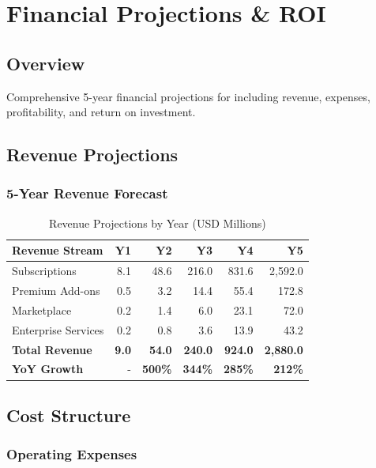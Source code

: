 \chapter{Financial Projections \& ROI}
\label{ch:financial-projections}

\section{Overview}
Comprehensive 5-year financial projections for \lifeos{} including revenue, expenses, profitability, and return on investment.

\section{Revenue Projections}

\subsection{5-Year Revenue Forecast}

\begin{table}[H]
\centering
\caption{Revenue Projections by Year (USD Millions)}
\begin{tabular}{|l|r|r|r|r|r|}
\hline
\rowcolor{lightgray}
\textbf{Revenue Stream} & \textbf{Y1} & \textbf{Y2} & \textbf{Y3} & \textbf{Y4} & \textbf{Y5} \\
\hline
Subscriptions & 8.1 & 48.6 & 216.0 & 831.6 & 2,592.0 \\
\hline
Premium Add-ons & 0.5 & 3.2 & 14.4 & 55.4 & 172.8 \\
\hline
Marketplace & 0.2 & 1.4 & 6.0 & 23.1 & 72.0 \\
\hline
Enterprise Services & 0.2 & 0.8 & 3.6 & 13.9 & 43.2 \\
\hline
\textbf{Total Revenue} & \textbf{9.0} & \textbf{54.0} & \textbf{240.0} & \textbf{924.0} & \textbf{2,880.0} \\
\hline
\textbf{YoY Growth} & - & \textbf{500\%} & \textbf{344\%} & \textbf{285\%} & \textbf{212\%} \\
\hline
\end{tabular}
\end{table}

\section{Cost Structure}

\subsection{Operating Expenses}

